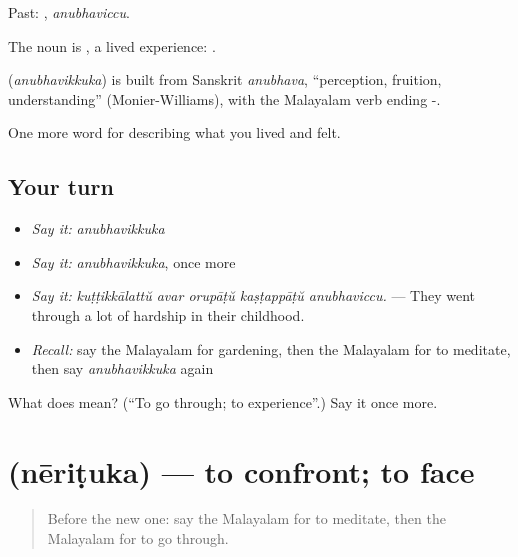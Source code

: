 Past: , \emph{anubhaviccu}.

The noun is , a lived experience:     .

\begin{cousinweb}
\textbf{} (\emph{anubhavikkuka}) is built from Sanskrit \emph{anubhava}, \textquotedblleft{}perception, fruition, understanding\textquotedblright{} (Monier-Williams), with the Malayalam verb ending -.
\end{cousinweb}

\begin{grammarlens}[title={What you've built}]
One more word for describing what you lived and felt.
\end{grammarlens}

\subsection*{Your turn}
\begin{itemize}
\raggedright
  \item \emph{Say it:} \emph{anubhavikkuka}
  \item \emph{Say it:} \emph{anubhavikkuka}, once more
  \item \emph{Say it:} \emph{kuṭṭikkālattŭ avar orupāṭŭ kaṣṭappāṭŭ anubhaviccu.} — They went through a lot of hardship in their childhood.
  \item \emph{Recall:} say the Malayalam for gardening, then the Malayalam for to meditate, then say \emph{anubhavikkuka} again
\end{itemize}

\begin{tcolorbox}[breakable,colback=teal!4,colframe=teal!35!black,title={Before you move on}]
What does  mean? (\textquotedblleft{}To go through; to experience\textquotedblright{}.) Say it once more.
\end{tcolorbox}
\section[\texorpdfstring{\ml{നേരിടുക} (nēriṭuka)}{നേരിടുക (nēriṭuka)}]{ (nēriṭuka) — to confront; to face}

\label{lesson:ML-C567-nerituka}



\begin{quote}
Before the new one: say the Malayalam for to meditate, then the Malayalam for to go through.
\end{quote}

